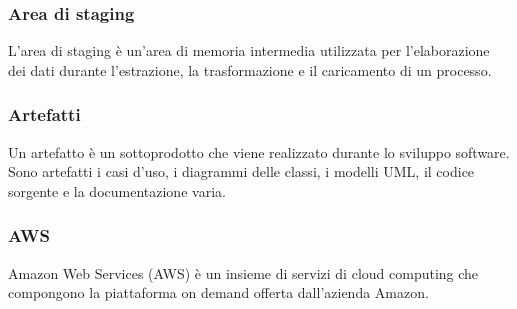 \subsubsection*{Area di staging}
L'area di staging è un'area di memoria intermedia utilizzata per l'elaborazione dei dati durante l'estrazione, la trasformazione e il caricamento di un processo.

\subsubsection*{Artefatti}
Un artefatto è un sottoprodotto che viene realizzato durante lo sviluppo software. Sono artefatti i casi d'uso, i diagrammi delle classi, i modelli UML\glo, il codice sorgente e la documentazione varia.

\subsubsection*{AWS}
Amazon Web Services (AWS) è un insieme di servizi di cloud computing che compongono la piattaforma on demand offerta dall’azienda Amazon.

